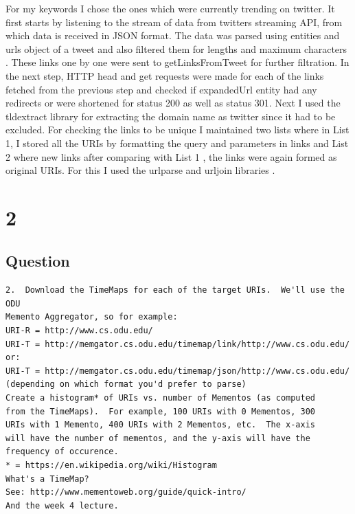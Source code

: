 \documentclass[letterpaper,11pt]{article}
\begin{document}

For my keywords I chose the ones which were currently trending on twitter. It first starts by listening to the stream of data from twitters streaming API, from which data is received in JSON format. The data was parsed using entities and urls object of a tweet and also filtered them for lengths and maximum characters \cite{streamref}. These links one by one were sent to getLinksFromTweet for further filtration.
In the next step, HTTP head and get requests \cite{urllibref} were made for each of the links fetched from the previous step and checked if expandedUrl entity had any redirects or were shortened for status 200 as well as status 301. Next I used the tldextract \cite{tlderef} library for extracting the domain name as twitter since it had to be excluded. For checking the links to  be unique I maintained two lists where in List 1,  I stored all the URIs by formatting the query and parameters in links and List 2 where new links after comparing with List 1 , the links were again formed as original URIs. For this I used the urlparse and urljoin libraries \cite{parseref}.
\clearpage
\section*{2}
\subsection*{Question}
\begin{verbatim}
2.  Download the TimeMaps for each of the target URIs.  We'll use the ODU 
Memento Aggregator, so for example:
URI-R = http://www.cs.odu.edu/
URI-T = http://memgator.cs.odu.edu/timemap/link/http://www.cs.odu.edu/
or:
URI-T = http://memgator.cs.odu.edu/timemap/json/http://www.cs.odu.edu/
(depending on which format you'd prefer to parse)
Create a histogram* of URIs vs. number of Mementos (as computed
from the TimeMaps).  For example, 100 URIs with 0 Mementos, 300
URIs with 1 Memento, 400 URIs with 2 Mementos, etc.  The x-axis
will have the number of mementos, and the y-axis will have the
frequency of occurence.
* = https://en.wikipedia.org/wiki/Histogram
What's a TimeMap?  
See: http://www.mementoweb.org/guide/quick-intro/
And the week 4 lecture. 
\end{verbatim}
\clearpage
\end{document}
